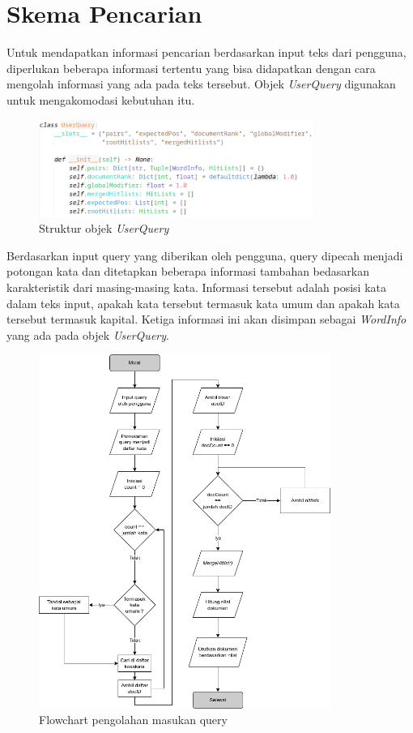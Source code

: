 \section{Skema Pencarian}

Untuk mendapatkan informasi pencarian berdasarkan input teks dari pengguna,
diperlukan beberapa informasi tertentu yang bisa didapatkan dengan cara mengolah 
informasi yang ada pada teks tersebut. Objek \textit{UserQuery} digunakan untuk 
mengakomodasi kebutuhan itu.

\begin{figure}[H]
  \centering{}
	\includegraphics[width=0.8\textwidth]{gambar/struktur_userquery}
  \caption{Struktur objek \textit{UserQuery}}
\end{figure}

Berdasarkan input query yang diberikan oleh pengguna, query dipecah menjadi
potongan kata dan ditetapkan beberapa informasi tambahan bedasarkan 
karakteristik dari masing-masing kata. Informasi tersebut adalah posisi kata 
dalam teks input, apakah kata tersebut termasuk kata umum dan apakah kata 
tersebut termasuk kapital. Ketiga informasi ini akan disimpan sebagai
\textit{WordInfo} yang ada pada objek \textit{UserQuery}.

\begin{figure}[H]
  \centering{}
	\includegraphics[width=0.85\textwidth]{gambar/flowchart_pencarian}
  \caption{Flowchart pengolahan masukan query}
\end{figure}

